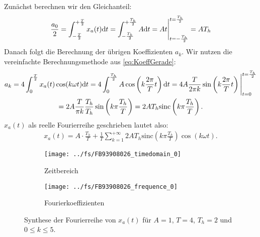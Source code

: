 \documentclass[11pt,a4paper,DIV=12]{scrartcl}
\newcommand{\sinc}{\mathrm{sinc}}
\begin{document}
Zunächst berechnen wir den Gleichanteil:
\begin{align}
	\frac{a_0} {2} = \int_{-\frac{T}{2}}^{+\frac{T}{2}}x_{a}(t)\mathrm{d} t =
	\int_{-\frac{T_h}{2}}^{+\frac{T_h}{2}}A\mathrm{d} t
	=A t \Bigg |_{t=-\frac{T_h}{2}}^{t=\frac{T_h}{2}}
	=AT_h
\end{align}
%
Danach folgt die Berechnung der übrigen Koeffizienten $a_k$.
%
Wir nutzen die vereinfachte Berechnungsmethode aus \ref{eq:KoeffGerade}:
%
\begin{gather}
	a_k=4\int_0^{\frac{T}{2}}x_{a}(t)\cos(k\omega t)\diff t
	=4\int_0^{\frac{T_h}{2}}A\cos\left(k\frac{2\pi}{T} t\right)\diff t
	=4A\frac{T}{2\pi k}\sin\left(k\frac{2\pi}{T} t\right)\Bigg |_{t=0}^{t=\frac{T_h}{2}}\\\nonumber
	=2A\frac{T}{\pi k}\frac{T_h}{T_h}\sin\left(k\pi \frac{T_h}{T}\right)
	=2AT_h\sinc\left(k\pi\frac{T_h}{T} \right).
\end{gather}
%
$x_{a}(t)$ als reelle Fourierreihe geschrieben lautet also:
%
\begin{align}
	x_{a}(t)=A\cdot\frac{T_h}{T}+\frac{1}{T}\sum_{k=1}^{+\infty}2AT_h\sinc\left(k\pi\frac{T_h}{T}\right)\cos(k\omega t).
\end{align}
%
\begin{figure}
	\centering
	\begin{subfigure}{\textwidth}
		\texttt{[image: ../fs/FB93908026\_timedomain\_0]}
		\caption{Zeitbereich}
	\end{subfigure}
	\begin{subfigure}{\textwidth}
		\texttt{[image: ../fs/FB93908026\_frequence\_0]}
		\caption{Fourierkoeffizienten}
	\end{subfigure}
	\caption{Synthese der Fourierreihe von $x_a(t)$ für $A=1$, $T=4$, $T_h=2$ und
		$0\leq k\leq5$.}
\end{figure}
\newpage
\end{document}

